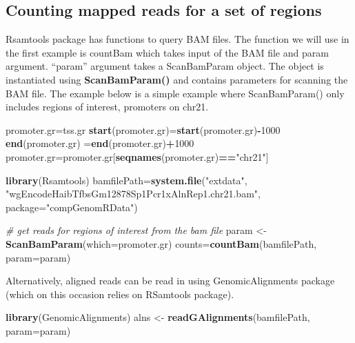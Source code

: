 \documentclass[12pt,]{krantz}
\newenvironment{Shaded}{\begin{snugshade}}{\end{snugshade}}
\newcommand{\CommentTok}[1]{\textcolor[rgb]{0.56,0.35,0.01}{\textit{#1}}}
\newcommand{\DataTypeTok}[1]{\textcolor[rgb]{0.13,0.29,0.53}{#1}}
\newcommand{\DecValTok}[1]{\textcolor[rgb]{0.00,0.00,0.81}{#1}}
\newcommand{\KeywordTok}[1]{\textcolor[rgb]{0.13,0.29,0.53}{\textbf{#1}}}
\newcommand{\NormalTok}[1]{#1}
\newcommand{\OperatorTok}[1]{\textcolor[rgb]{0.81,0.36,0.00}{\textbf{#1}}}
\newcommand{\StringTok}[1]{\textcolor[rgb]{0.31,0.60,0.02}{#1}}
\begin{document}
\hypertarget{counting-mapped-reads-for-a-set-of-regions}{%
\subsection{Counting mapped reads for a set of regions}\label{counting-mapped-reads-for-a-set-of-regions}}

Rsamtools package has functions to query BAM files. The function we will use in the first example is countBam which takes input of the BAM file and param argument. ``param'' argument takes a ScanBamParam object. The object is instantiated using \textbf{ScanBamParam()} and contains parameters for scanning the BAM file. The example below is a simple example where ScanBamParam() only includes regions of interest, promoters on chr21.

\begin{Shaded}
\begin{Highlighting}[]
\NormalTok{promoter.gr=tss.gr}
\KeywordTok{start}\NormalTok{(promoter.gr)=}\KeywordTok{start}\NormalTok{(promoter.gr)}\OperatorTok{-}\DecValTok{1000}
\KeywordTok{end}\NormalTok{(promoter.gr)  =}\KeywordTok{end}\NormalTok{(promoter.gr)}\OperatorTok{+}\DecValTok{1000}
\NormalTok{promoter.gr=promoter.gr[}\KeywordTok{seqnames}\NormalTok{(promoter.gr)}\OperatorTok{==}\StringTok{"chr21"}\NormalTok{]}

\KeywordTok{library}\NormalTok{(Rsamtools)}
\NormalTok{bamfilePath=}\KeywordTok{system.file}\NormalTok{(}\StringTok{"extdata"}\NormalTok{,}
            \StringTok{"wgEncodeHaibTfbsGm12878Sp1Pcr1xAlnRep1.chr21.bam"}\NormalTok{,}
                      \DataTypeTok{package=}\StringTok{"compGenomRData"}\NormalTok{)}

\CommentTok{# get reads for regions of interest from the bam file}
\NormalTok{param <-}\StringTok{ }\KeywordTok{ScanBamParam}\NormalTok{(}\DataTypeTok{which=}\NormalTok{promoter.gr)}
\NormalTok{counts=}\KeywordTok{countBam}\NormalTok{(bamfilePath, }\DataTypeTok{param=}\NormalTok{param)}
\end{Highlighting}
\end{Shaded}

Alternatively, aligned reads can be read in using GenomicAlignments package (which on this occasion relies on RSamtools package).

\begin{Shaded}
\begin{Highlighting}[]
\KeywordTok{library}\NormalTok{(GenomicAlignments)}
\NormalTok{alns <-}\StringTok{ }\KeywordTok{readGAlignments}\NormalTok{(bamfilePath, }\DataTypeTok{param=}\NormalTok{param)}
\end{Highlighting}
\end{Shaded}
\end{document}
